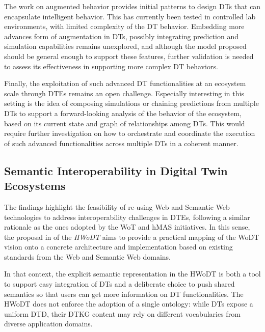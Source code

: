 The work on augmented behavior provides initial patterns to design \acp{DT} that can encapsulate intelligent behavior. 
%
This has currently been tested in controlled lab environments, with limited complexity of the \ac{DT} behavior.
%
Embedding more advances form of augmentation in \acp{DT}, possibly integrating prediction and simulation capabilities remains unexplored, and although the model proposed should be general enough to support these features, further validation is needed to assess its effectiveness in supporting more complex \ac{DT} behaviors.

Finally, the exploitation of such advanced \ac{DT} functionalities at an ecosystem scale through \acp{DTE} remains an open challenge.
%
Especially interesting in this setting is the idea of composing simulations or chaining predictions from multiple \acp{DT} to support a forward-looking analysis of the behavior of the ecosystem, based on its current state and graph of relationships among \acp{DT}.
%
This would require further investigation on how to orchestrate and coordinate the execution of such advanced functionalities across multiple \acp{DT} in a coherent manner.

\subsection*{Semantic Interoperability in Digital Twin Ecosystems}

The findings highlight the feasibility of re-using Web and Semantic Web technologies to address interoperability challenges in \acp{DTE}, following a similar rationale as the ones adopted by the \ac{WoT} and \ac{hMAS} initiatives. 
%
In this sense, the proposal in  of the \emph{\ac{HWoDT}} aims to provide a practical mapping of the \ac{WoDT} vision onto a concrete architecture and implementation based on existing standards from the Web and Semantic Web domains.

In that context, the explicit semantic representation in the \ac{HWoDT} is both a tool to support easy integration of \acp{DT} and a deliberate choice to push shared semantics so that users can get more information on \ac{DT} functionalities.
%
The \ac{HWoDT} does not enforce the adoption of a single ontology: while \acp{DT} expose a uniform \ac{DTD}, their \ac{DTKG} content may rely on different vocabularies from diverse application domains.


